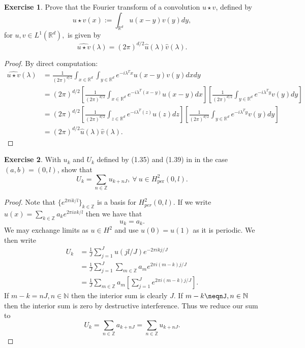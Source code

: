 \documentclass{amsart}
\theoremstyle{plain}
\theoremstyle{definition}
\newtheorem{exer}{Exercise}[section]
\newcommand{\R}{\mathbb{R}}
\newcommand{\Z}{\mathbb{Z}}
\newcommand{\N}{\mathbb{N}}
\begin{document}
\begin{exer}
     Prove that the Fourier transform of a convolution $u\star v$, defined by
    $$u\star v(x)  := \int_{\R^d} u(x-y)v(y) dy,$$
    for $u,v \in L^1(\R^d),$ is given by 
    $$\widehat{u\star v}(\lambda) = \left(2\pi\right)^{d/2} \widehat{u}(\lambda)\widehat{v}(\lambda).$$
\end{exer}
\begin{proof}
By direct computation:
\begin{align*}
    \widehat{u\star v}(\lambda)&= \frac{1}{\left(2\pi\right)^{d/2}}\int_{x\in \R^d} \int_{y \in \R^d} e^{-i\lambda^T x} u(x-y)v(y) dx dy\\
    &= \left(2\pi\right)^{d/2}\left[ \frac{1}{\left(2\pi\right)^{d/2}}\int_{x\in \R^d} e^{-i\lambda^T (x-y)}u(x-y) dx \right]\left[ \frac{1}{\left(2\pi\right)^{d/2}}\int_{y\in \R^d} e^{-i\lambda^T y}v(y) dy\right]\\
    &= \left(2\pi\right)^{d/2}\left[ \frac{1}{\left(2\pi\right)^{d/2}}\int_{z\in \R^d} e^{-i\lambda^T (z)}u(z) dz \right]\left[ \frac{1}{\left(2\pi\right)^{d/2}}\int_{y\in \R^d} e^{-i\lambda^T y}v(y) dy\right]\\
    &= {\left(2\pi\right)^{d/2}}\widehat{u}(\lambda)\widehat{v}(\lambda).
\end{align*}    
\end{proof}

\begin{exer}
\label{Exercise 1.22}
With $u_k$ and $U_k$ defined by (1.35) and (1.39) in \cite{lord2014introduction} in the case $(a,b) =(0,l)$, show that
$$U_k = \sum_{n\in \Z} u_{k+nJ}, \ \forall \ u\in H^2_{\text{per}}(0,l).$$
\end{exer}
\begin{proof}
    Note that $\{e^{2\pi i k/l}\}_{k\in \Z}$ is a basis for $H^2_{per}(0,l).$ If we write $u(x) =\sum_{k\in\Z} a_k e^{2\pi i x k/l}$ then we have that
    $$u_k = a_k. $$
    We may exchange limits as $u\in H^2$ and use $u(0)= u(1)$ as it is periodic. We then write
    \begin{align*}
        U_k &= \frac{1}{J}\sum_{j=1}^J u(jl/J) e^{-2\pi i k j/J}\\
        &= \frac{1}{J}\sum_{j=1}^J \sum_{m\in \Z}  a_m e^{2\pi i(m-k) j/J }\\
        &= \frac{1}{J}\sum_{m\in\Z}a_m\left[\sum_{j=1}^J  e^{2\pi i (m-k)j/J}\right].
    \end{align*}
    If $m-k=nJ, n\in \N$ then the interior sum is clearly $J$. If $m-k\neqnJ, n\in\N$ then the interior sum is zero by destructive interference. Thus we reduce our sum to
    $$U_k = \sum_{n\in\Z}a_{k+nJ} = \sum_{n\in\Z} u_{k+nJ}.$$
\end{proof}
\end{document}

